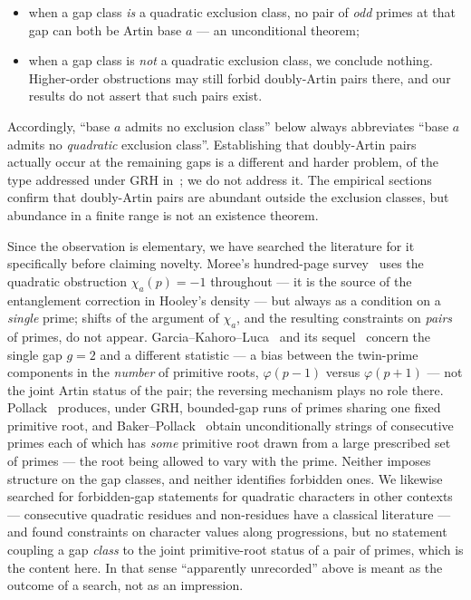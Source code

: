 \documentclass[11pt,reqno]{amsart}
\theoremstyle{plain}
\theoremstyle{definition}
\begin{document}
\begin{itemize}
\item when a gap class \emph{is} a quadratic exclusion class, no pair of
      \emph{odd} primes at that gap can both be Artin base $a$ --- an
      unconditional theorem;
\item when a gap class is \emph{not} a quadratic exclusion class, we conclude
      nothing. Higher-order obstructions may still forbid doubly-Artin pairs
      there, and our results do not assert that such pairs exist.
\end{itemize}

Accordingly, ``base $a$ admits no exclusion class'' below always abbreviates
``base $a$ admits no \emph{quadratic} exclusion class''. Establishing that
doubly-Artin pairs actually occur at the remaining gaps is a different and
harder problem, of the type addressed under GRH in~\cite{Pollack2014}; we do
not address it. The empirical sections confirm that doubly-Artin pairs are
abundant outside the exclusion classes, but abundance in a finite range is not
an existence theorem.

Since the observation is elementary, we have searched the literature for it
specifically before claiming novelty. Moree's hundred-page
survey~\cite{Moree2012} uses the quadratic obstruction $\chi_a(p) = -1$
throughout --- it is the source of the entanglement correction in Hooley's
density --- but always as a condition on a \emph{single} prime; shifts of the
argument of $\chi_a$, and the resulting constraints on \emph{pairs} of primes,
do not appear. Garcia--Kahoro--Luca~\cite{GarciaKahoroLuca2019} and its
sequel~\cite{GarciaLucaShiUdell2020} concern the single gap $g = 2$ and a
different statistic --- a bias between the twin-prime components in the
\emph{number} of primitive roots, $\varphi(p-1)$ versus $\varphi(p+1)$ --- not
the joint Artin status of the pair; the reversing mechanism plays no role
there. Pollack~\cite{Pollack2014} produces, under GRH, bounded-gap runs of primes
sharing one fixed primitive root, and
Baker--Pollack~\cite{BakerPollack2016} obtain unconditionally strings of
consecutive primes each of which has \emph{some} primitive root drawn from a
large prescribed set of primes --- the root being allowed to vary with the
prime. Neither imposes structure on the gap classes, and neither identifies
forbidden ones. We likewise
searched for forbidden-gap statements for quadratic characters in other
contexts --- consecutive quadratic residues and non-residues have a classical
literature --- and found constraints on character values along progressions,
but no statement coupling a gap \emph{class} to the joint primitive-root
status of a pair of primes, which is the content here. In that sense
``apparently unrecorded'' above is meant as the outcome of a search, not as an
impression.
\end{document}
